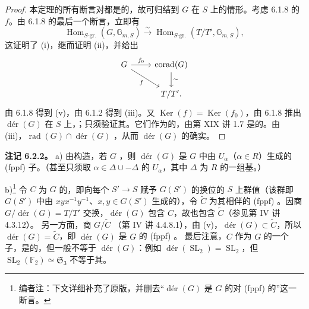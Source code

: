 \begin{proof}
本定理的所有断言对都是的，故可归结到 $G$ 在 $S$ 上的情形。考虑 6.1.8 的 $f$。由 6.1.8 的最后一个断言，立即有
\[\operatorname{Hom}_{S\text{-gr.}}(G,\mathbb G_{m,S})\xrightarrow\sim
\operatorname{Hom}_{S\text{-gr.}}(T/T',\mathbb G_{m,S}),\]
这证明了 (i)，继而证明 (ii)，并给出
\[\begin{tikzcd}
G\arrow[r,"f_0"]\arrow[dr,"f"']&\operatorname{corad}(G)\arrow[d,"\sim"]\\
&T/T'.
\end{tikzcd}\]
由 6.1.8 得到 (v)，由 6.1.2 得到 (iii)。又 $\operatorname{Ker}(f)=\operatorname{Ker}(f_0)$，由 6.1.8 推出 $\operatorname{d\text{é}r}(G)$ 在 $S$ 上，；只须验证其。它们作为的，由第 XIX 讲 1.7 是的。由 (iii)，$\operatorname{rad}(G)\cap\operatorname{d\text{é}r}(G)$ ，从而 $\operatorname{d\text{é}r}(G)$ 的确实。
\end{proof}
\textbf{注记 6.2.2。} a) 由构造，若 $G$ ，则 $\operatorname{d\text{é}r}(G)$ 是 $G$ 中由 $U_\alpha$（$\alpha\in R$）生成的 (fppf) 子。（甚至只须取 $\alpha\in\Delta\cup-\Delta$ 的 $U_\alpha$，其中 $\Delta$ 为 $R$ 的一组基。）

b)\footnote{编者注：下文详细补充了原版，并删去“$\operatorname{d\text{é}r}(G)$ 是 $G$ 的对 (fppf) 的”这一断言。} 令 $C$ 为 $G$ 的，即向每个 $S'\to S$ 赋予 $G(S')$ 的换位的 $S$ 上群值（该群即 $G(S')$ 中由 $xyx^{-1}y^{-1}$、$x,y\in G(S')$ 生成的），令 $\widetilde C$ 为其相伴的 (fppf) 。因商 $G/\operatorname{d\text{é}r}(G)=T/T'$ 交换，$\operatorname{d\text{é}r}(G)$ 包含 $C$，故也包含 $\widetilde C$（参见第 IV 讲 4.3.12）。
另一方面，商 $G/\widetilde C$ （第 IV 讲 4.4.8.1），由 (v)，$\operatorname{d\text{é}r}(G)\subset\widetilde C$，所以 $\operatorname{d\text{é}r}(G)=\widetilde C$，即 $\operatorname{d\text{é}r}(G)$ 是 $G$ 的 (fppf) 。
最后注意，$C$ 作为 $G$ 的一个子，是的，但一般不等于 $\operatorname{d\text{é}r}(G)$：例如 $\operatorname{d\text{é}r}(\operatorname{SL}_2)=\operatorname{SL}_2$，但 $\operatorname{SL}_2(\mathbb F_2)\simeq\mathfrak S_3$ 不等于其。

